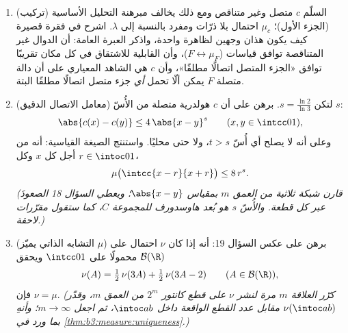 \begin{problem}
\begin{enumerate}[resume]
  \item (تركيب) السلّم $c$ متصل وغير متناقص ومع ذلك يخالف
        مبرهنة التحليل الأساسية (الجزء الأول)؛  $\mu_c$
         احتمال بلا ذرّات ومفرد بالنسبة إلى $\lambda$. اشرح
        في فقرة قصيرة كيف يكون هذان وجهين لظاهرة واحدة، واذكر
        العبرة العامة: أن الدوال غير المتناقصة توافق قياسات
        ($F \leftrightarrow \mu_F$)، وأن القابلية للاشتقاق في كل مكان تقريبًا
        توافق «الجزء المتصل اتصالًا مطلقًا»، وأن $c$ هي الشاهد
        المعياري على أن دالة متصلة $F$ يمكن ألّا تحمل \emph{أي}
        جزء متصل اتصالًا مطلقًا البتة.
  \item (معامل الاتصال الدقيق) لتكن $s =
        \frac{\ln 2}{\ln 3}$. برهن على أن $c$
        هولدرية متصلة من الأُسّ $s$:
        \[
        \abs{c(x) - c(y)} \leq 4\,\abs{x - y}^{s}
        \qquad (x, y \in \intcc01),
        \]
        وعلى أنه لا يصلح أي أُسّ $t > s$، ولا حتى محليًا. واستنتج
        الصيغة القياسية: أنه من أجل كل $x$ وكل $r \in \intoc01$،
        \[
        \mu\bigl(\intcc{x - r}{x + r}\bigr) \leq 8\,r^{s} .
        \]
        \emph{(قارن شبكة ثلاثية من العمق $m$ بمقياس
        $\abs{x - y}$؛ ويعطي السؤال 18 الصعودَ عبر كل قطعة.
        والأُسّ $s$ هو بُعد هاوسدورف للمجموعة $C$، كما ستقول
        مقرّرات لاحقة.)}
  \item (التشابه الذاتي يميّز $\mu$) برهن على عكس السؤال 19: أنه
        إذا كان $\nu$  احتمال على $\mathcal B(\R)$ محمولًا
        على $\intcc01$ ويحقق
        \[
        \nu(A) = \tfrac12\,\nu(3A) + \tfrac12\,\nu(3A - 2)
        \qquad (A \in \mathcal B(\R)),
        \]
        فإن $\nu = \mu$. \emph{(كرّر العلاقة $m$ مرة لنشر $\nu$
        على قطع كانتور $2^m$ من العمق $m$، وقدّر $\nu(\intoc ab)$
        مقابل عدد القطع الواقعة داخل $\intoc ab$، ثم اجعل
        $m \to \infty$؛ وأنهِ بما ورد في \cref{thm:b3:measure:uniqueness}.)}
\end{enumerate}
\end{problem}
